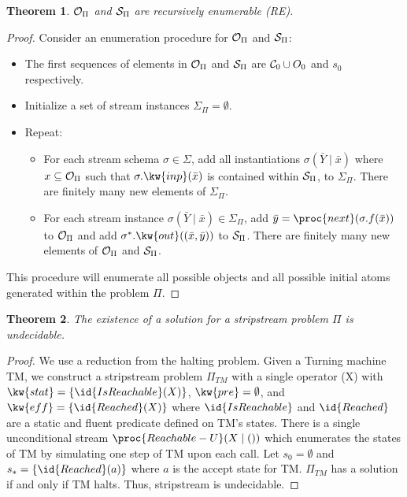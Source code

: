 \documentclass[letterpaper]{article} %
\theoremstyle{plain}\newtheorem{thm}{Theorem}
\theoremstyle{definition}\newtheorem{defn}{Definition}
\theoremstyle{plain}\newtheorem{lem}{Lemma}
\theoremstyle{plain}\newtheorem{cor}{Corollary}
\newcommand{\algname}{{\sc strips}tream}
\begin{document}
\begin{thm}  \label{thm:re}
${\cal O}_\Pi$ and ${\cal S}_\Pi$ are recursively enumerable (RE). 
\end{thm}
\begin{proof}
Consider an enumeration procedure for ${\cal O}_\Pi$ and ${\cal S}_\Pi$:
\begin{itemize}
\item The first sequences of elements in ${\cal O}_\Pi$ and 
${\cal S}_\Pi$ are ${\cal C}_0 \cup O_0$ and $s_0$ respectively.
\item Initialize a set of stream instances $\Sigma_\Pi = \emptyset$.
\item Repeat:
\begin{itemize}
\item For each stream schema $\sigma \in \Sigma$, add all
  instantiations $\sigma(\bar{Y} \mid \bar{x})$ where $x \subseteq {\cal O}_\Pi$ such that
  $\sigma.\kw{inp}(\bar{x})$ is contained within ${\cal S}_\Pi$,
  to $\Sigma_\Pi$. There are finitely many new elements of
  $\Sigma_\Pi$.
\item For each stream instance $\sigma(\bar{Y} \mid \bar{x}) \in \Sigma_\Pi$, add
  $\bar{y} = \proc{next}(\sigma.f(\bar{x}))$ to ${\cal O}_\Pi$ and add
  $\sigma^*.\kw{out}((\bar{x}, \bar{y}))$ to ${\cal S}_\Pi$.
  There are finitely many new elements of ${\cal O}_\Pi$ and ${\cal S}_\Pi$.
\end{itemize}
\end{itemize}
This procedure will enumerate all possible objects and all possible
initial atoms generated within the problem $\Pi$.
\end{proof}

\begin{thm}
The existence of a solution for a \algname{} problem $\Pi$ is
undecidable. 
\end{thm}
\begin{proof}
We use a reduction from the halting problem.
Given a Turning machine TM, we construct a \algname{} 
problem $\Pi_{TM}$ with a single operator
(X) with $\kw{stat} = \{\id{IsReachable}(X)\}$, 
$\kw{pre} = \emptyset$, and $\kw{eff} = \{\id{Reached}(X)\}$ where
$\id{IsReachable}$ and $\id{Reached}$ are a static and fluent predicate
defined on TM's states. There is a single unconditional stream $\proc{Reachable-U}(X \mid ())$ which 
enumerates the states of TM by simulating one step of TM upon each call.
Let $s_0 = \emptyset$ and $s_* = \{\id{Reached}(a)\}$
where $a$ is the accept state for TM. $\Pi_{TM}$ has a solution if and only if TM halts.
Thus, \algname{} is undecidable.
\end{proof}
\end{document}
